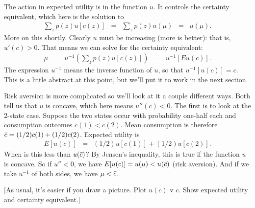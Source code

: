 \documentclass[11pt]{article}
\begin{document}
The action in expected utility is in the function $u$.
It controls the certainty equivalent, which here is the solution to
\begin{eqnarray*}
    \sum_z p(z) u[c(z)]
        &=&  \sum_z p(z) u(\mu)  \;\;=\;\; u(\mu) .
\end{eqnarray*}
More on this shortly.
Clearly $u$ must be increasing (more is better):
that is, $u'(c) > 0$.
That means we can solve for the certainty equivalent:
\begin{eqnarray*}
    \mu &=& u^{-1} \left( \sum_z p(z) u[c(z)] \right)
        \;\;=\;\; u^{-1} \left[ E u(c) \right] .
\end{eqnarray*}
The expression $u^{-1}$ means the inverse function of $u$,
so that $u^{-1} [u(c)] = c $.
This is a little abstract at this point, but we'll put it to work
in the next section.


Risk aversion is more complicated so
we'll look at it a couple different ways.
Both tell us that $u$ is concave,
which here means  $u''(c) < 0$.
The first is to look at the 2-state case.
Suppose the two states occur with probability one-half each
and consumption outcomes $c(1) < c(2)$.
Mean consumption is therefore $ \bar{c} = (1/2)c(1) + (1/2) c(2)$.
Expected utility is
\begin{eqnarray*}
    E [u(c)] &=&  (1/2) u[c(1)] + (1/2) u[c(2)] .
\end{eqnarray*}
When is this less than $u(\bar{c})$?
By Jensen's inequality, this is true if the function $u$ is concave.
So if $u'' < 0$, we have $E[u(c)] = u(\mu) < u(\bar{c})$ (risk aversion).
And if we take $u^{-1}$ of both sides, we have
$\mu < \bar{c}$.

\begin{comment}
ambiguity
Ellsberg:  1/3 1/3 1/3
\end{comment}

[As usual, it's easier if you draw a picture.
Plot $u(c)$ v $c$.
Show expected utility and certainty equivalent.]
\end{document}
